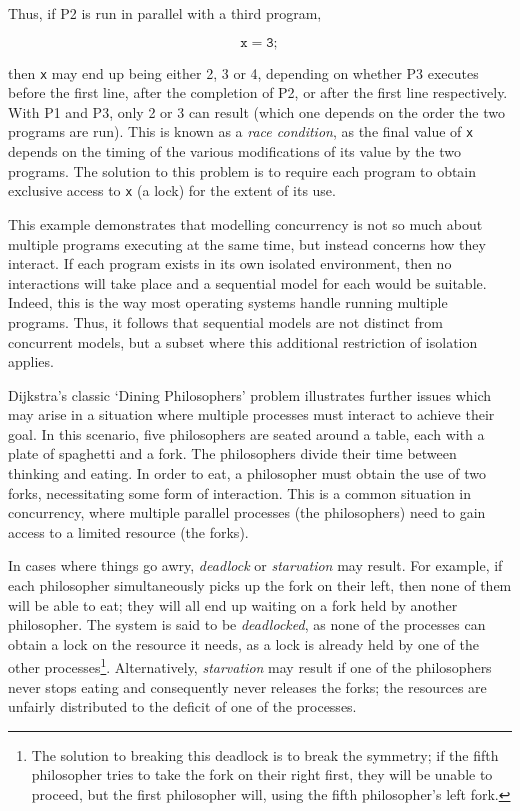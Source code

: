 Thus, if P2 is run in parallel with a third program,

\begin{equation}
\mathtt{x = 3;} \tag{P3}
\end{equation}

\noindent then \texttt{x} may end up being either 2, 3 or 4, depending
on whether P3 executes before the first line, after the completion of
P2, or after the first line respectively.  With P1 and P3, only 2 or 3
can result (which one depends on the order the two programs are run).
This is known as a \emph{race condition}, as the final value of
\texttt{x} depends on the timing of the various modifications of its
value by the two programs.  The solution to this problem is to require
each program to obtain exclusive access to \texttt{x} (a lock) for the
extent of its use.

This example demonstrates that modelling concurrency is not so much
about multiple programs executing at the same time, but instead
concerns how they interact.  If each program exists in its own
isolated environment, then no interactions will take place and a
sequential model for each would be suitable.  Indeed, this is the way
most operating systems handle running multiple programs.  Thus, it
follows that sequential models are not distinct from concurrent
models, but a subset where this additional restriction of isolation
applies.

Dijkstra's \cite{dijkstra:philosophers} classic `Dining Philosophers'
problem illustrates further issues which may arise in a situation
where multiple processes must interact to achieve their goal.  In this
scenario, five philosophers are seated around a table, each with a plate
of spaghetti and a fork.  The philosophers divide their time between
thinking and eating.  In order to eat, a philosopher must obtain the use
of two forks, necessitating some form of interaction.  This is a common
situation in concurrency, where multiple parallel processes (the
philosophers) need to gain access to a limited resource (the forks).

In cases where things go awry, \emph{deadlock} or \emph{starvation} may
result.  For example, if each philosopher simultaneously picks up the
fork on their left, then none of them will be able to eat; they will all
end up waiting on a fork held by another philosopher.  The system is
said to be \emph{deadlocked}, as none of the processes can obtain a lock
on the resource it needs, as a lock is already held by one of the other
processes\footnote{The solution to breaking this deadlock is to break
the symmetry; if the fifth philosopher tries to take the fork on their
right first, they will be unable to proceed, but the first philosopher
will, using the fifth philosopher's left fork.}.  Alternatively,
\emph{starvation} may result if one of the philosophers never stops
eating and consequently never releases the forks; the resources are
unfairly distributed to the deficit of one of the processes.

